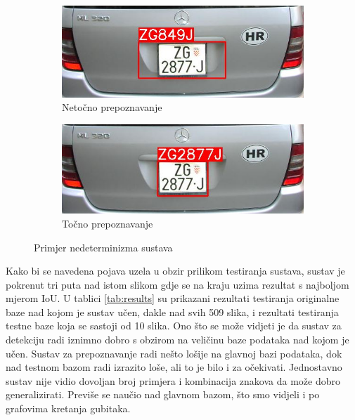 \documentclass[times, utf8, diplomski]{fer}
\begin{document}
\begin{figure}[H]
     \centering
     \begin{subfigure}[b]{0.4\textwidth}
         \centering
         \includegraphics[width=\textwidth]{figures/results/nondeterministic/incorrect_first.jpg}
         \caption{Netočno prepoznavanje}
     \end{subfigure}
     \hspace{0.5cm}
     \begin{subfigure}[b]{0.4\textwidth}
         \centering
         \includegraphics[width=\textwidth]{figures/results/nondeterministic/correct_second.jpg}
         \caption{Točno prepoznavanje}
     \end{subfigure}
    \caption{Primjer nedeterminizma sustava}
    \label{fig:ss-randomness}
\end{figure}

Kako bi se navedena pojava uzela u obzir prilikom testiranja sustava, sustav je pokrenut tri puta nad istom slikom gdje se na kraju uzima rezultat s najboljom mjerom IoU. U tablici \ref{tab:results} su prikazani rezultati testiranja originalne baze nad kojom je sustav učen, dakle nad svih 509 slika, i rezultati testiranja testne baze koja se sastoji od 10 slika. Ono što se može vidjeti je da sustav za detekciju radi iznimno dobro s obzirom na veličinu baze podataka nad kojom je učen. Sustav za prepoznavanje radi nešto lošije na glavnoj bazi podataka, dok nad testnom bazom radi izrazito loše, ali to je bilo i za očekivati. Jednostavno sustav nije vidio dovoljan broj primjera i kombinacija znakova da može dobro generalizirati. Previše se naučio nad glavnom bazom, što smo vidjeli i po grafovima kretanja gubitaka.
\end{document}
